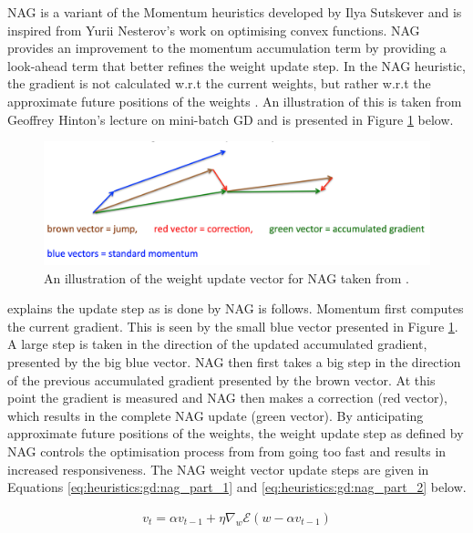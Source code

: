 \Acl{NAG} is a variant of the \ac{Momentum} heuristics developed by Ilya Sutskever \cite{ref:sutskever:2013-2} and is inspired from Yurii Nesterov's \cite{ref:nesterov:1983} work on optimising convex functions. \ac{NAG} provides an improvement to the momentum accumulation term by providing a look-ahead term that better refines the weight update step. In the \ac{NAG} heuristic, the gradient is not calculated w.r.t the current weights, but rather w.r.t the approximate future positions of the weights \cite{ref:ruder:2016}. An illustration of this is taken from Geoffrey Hinton's lecture on mini-batch \ac{GD} \cite{ref:hinton:2012} and is presented in Figure \ref{fig:heuristics:gd:nag} below.

\begin{figure}[htbp]
      \includegraphics[width=\textwidth]{images/nag.png}
      \caption{An illustration of the weight update vector for \ac{NAG} taken from \cite{ref:hinton:2012}.}
      \label{fig:heuristics:gd:nag}
\end{figure}


\citeauthor{ref:ruder:2016} \cite{ref:ruder:2016} explains the update step as is done by \ac{NAG} is follows. \ac{Momentum} first computes the current gradient. This is seen by the small blue vector presented in Figure \ref{fig:heuristics:gd:nag}. A large step is taken in the direction of the updated accumulated gradient, presented by the big blue vector. \ac{NAG} then first takes a big step in the direction of the previous accumulated gradient presented by the brown vector. At this point the gradient is measured and \ac{NAG} then makes a correction (red vector), which results in the complete NAG update (green vector). By anticipating approximate future positions of the weights, the weight update step as defined by \ac{NAG} controls the optimisation process from from going too fast and results in increased responsiveness. The \ac{NAG} weight vector update steps are given in Equations \ref{eq:heuristics:gd:nag_part_1} and \ref{eq:heuristics:gd:nag_part_2} below.

\begin{equation}
      \label{eq:heuristics:gd:nag_part_1}
      \begin{split}
            v_{t} = \alpha v_{t-1} + \eta \nabla_{w}\mathcal{E}(w - \alpha v_{t-1})
      \end{split}
\end{equation}

